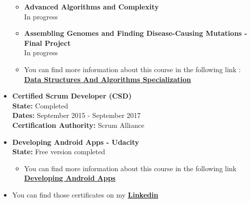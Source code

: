 \documentclass[a4paper,10pt]{article} %
\begin{document}
\begin{itemize}
\begin{itemize}
\fi
\item \textbf{Advanced Algorithms and Complexity}\\
In progress
\item \textbf{Assembling Genomes and Finding Disease-Causing Mutations - Final Project}\\
In progress
\item You can find more information about this course in the following link : \href{https://www.coursera.org/specializations/data-structures-algorithms}{\textbf{Data Structures And Algorithms Specialization}}\\
\end{itemize}
\item \textbf{Certified Scrum Developer (CSD)}\\
\textbf{State:} Completed\\
\textbf{Dates:} September 2015 - September 2017\\
\textbf{Certification Authority:} Scrum Alliance\\
\item \textbf{Developing Android Apps - Udacity}\\
\textbf{State:} Free version completed
\begin{itemize}
\item You can find more information about this course in the following link \href{https://www.udacity.com/course/developing-android-apps--ud853}{\textbf{Developing Android Apps}}
\end{itemize}
\item You can find those certificates on my \href{https://www.linkedin.com/in/esteban-foronda-sierra-217446b2}{\textbf{Linkedin}}\\
\end{itemize}



\newpage
\end{document}
